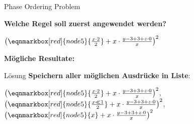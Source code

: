 \begin{frame}{Phase Ordering Problem}
    \begin{center}
        \textbf{Welche Regel soll zuerst angewendet werden?}
    \end{center}\vspace{5mm}

    \begin{center}
        {\Large $\left(\eqnmarkbox[red]{node5}{\frac{x \cdot 2}{2}} + x \cdot \frac{y - 3 + 3 + z \cdot 0}{x}\right)^2$ }\vspace{7mm}
    \end{center}

    \begin{center}
        \textbf{Mögliche Resultate:}
    \end{center}\vspace{2mm}

    \begin{tcbitemize}[raster equal height=rows, raster columns=2,
        raster every box/.style={size=small,valign=center,halign=center,colframe=white,colback=white}]
    \end{tcbitemize}
\end{frame}

\begin{frame}{Lösung}
    \textbf{Speichern aller möglichen Ausdrücke in Liste}: \vspace{5mm}

    \begin{tcolorbox}[title=ExprList, center title]
        $\left(\eqnmarkbox[red]{node5}{\frac{x \cdot 2}{2}} + x \cdot \frac{y - 3 + 3 + z \cdot 0}{x}\right)^2$,
        $\left(\eqnmarkbox[red]{node5}{\frac{x \ll 1}{2}} + x \cdot \frac{y - 3 + 3 + z \cdot 0}{x}\right)^2$,
        $\left(\eqnmarkbox[red]{node5}{x} + x \cdot \frac{y - 3 + 3 + z \cdot 0}{x}\right)^2$
    \end{tcolorbox}
\end{frame}

